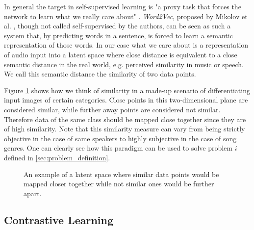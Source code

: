 In general the target in self-supervised learning is "a proxy task that forces the network to learn what we really care about" \cite{zisserman2018selfsupervised}. \textit{Word2Vec}, proposed by Mikolov et al. \cite{mikolov2013efficient}, though not called self-supervised by the authors, can be seen as such a system that, by predicting words in a sentence, is forced to learn a semantic representation of those words. In our case what we care about is a representation of audio input into a latent space where close distance is equivalent to a close semantic distance in the real world, e.g. perceived similarity in music or speech. We call this semantic distance the similarity of two data points.

Figure \ref{fig:clusters} shows how we think of similarity in a made-up scenario of differentiating input images of certain categories. Close points in this two-dimensional plane are considered similar, while further away points are considered not similar. Therefore data of the same class should be mapped close together since they are of high similarity. Note that this similarity measure can vary from being strictly objective in the case of same speakers to highly subjective in the case of song genres. One can clearly see how this paradigm can be used to solve problem $i$ defined in \ref{sec:problem_definition}.

\begin{figure}[t]
    \centering
    \scalebox{.6}{}
    \caption[Latent space]{An example of a latent space where similar data points would be mapped closer together while not similar ones would be further apart.}
    \label{fig:clusters}
\end{figure}


\subsection{Contrastive Learning}\label{subsec:contrastive_learning}

